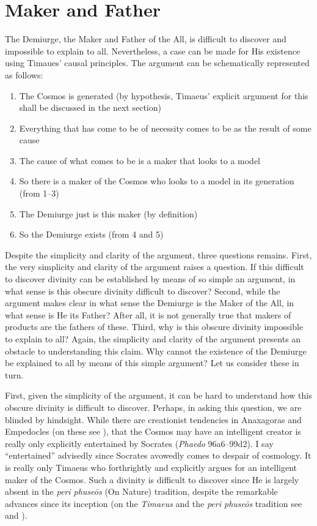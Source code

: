
\section{Maker and Father} %
\label{sec:maker_and_father}

The Demiurge, the Maker and Father of the All, is difficult to discover and impossible to explain to all. Nevertheless, a case can be made for His existence using Timaues' causal principles. The argument can be schematically represented as follows:
\begin{enumerate}[(1)]
	\item The Cosmos is generated (by hypothesis, Timaeus' explicit argument for this shall be discussed in the next section)
	\item Everything that has come to be of necessity comes to be as the result of some cause
	\item The cause of what comes to be is a maker that looks to a model
	\item So there is a maker of the Cosmos who looks to a model in its generation (from 1--3)
	\item The Demiurge just is this maker (by definition)
	\item So the Demiurge exists (from 4 and 5)
\end{enumerate}

Despite the simplicity and clarity of the argument, three questions remains. First, the very simplicity and clarity of the argument raises a question. If this difficult to discover divinity can be established by means of so simple an argument, in what sense is this obscure divinity difficult to discover? Second, while the argument makes clear in what sense the Demiurge is the Maker of the All, in what sense is He its Father? After all, it is not generally true that makers of products are the fathers of these. Third, why is this obscure divinity impossible to explain to all? Again, the simplicity and clarity of the argument presents an obstacle to understanding this claim. Why cannot the existence of the Demiurge be explained to all by means of this simple argument? Let us consider these in turn.

First, given the simplicity of the argument, it can be hard to understand how this obscure divinity is difficult to discover. Perhaps, in asking this question, we are blinded by hindsight. While there are creationist tendencies in Anaxagoras and Empedocles (on these see \citealt[chapters 1 and 2]{Sedley:2007pi}), that the Cosmos may have an intelligent creator is really only explicitly entertained by Socrates (\emph{Phaedo} 96a6–99d2). I say ``entertained'' advisedly since Socrates avowedly comes to despair of cosmology. It is really only Timaeus who forthrightly and explicitly argues for an intelligent maker of the Cosmos. Such a divinity is difficult to discover since He is largely absent in the \emph{peri phuseōs} (On Nature) tradition, despite the remarkable advances since its inception (on the \emph{Timaeus} and the \emph{peri phuseōs} tradition see \citealt{Naddaf:1997jt} and \citealt{Runia:1997vz}).

